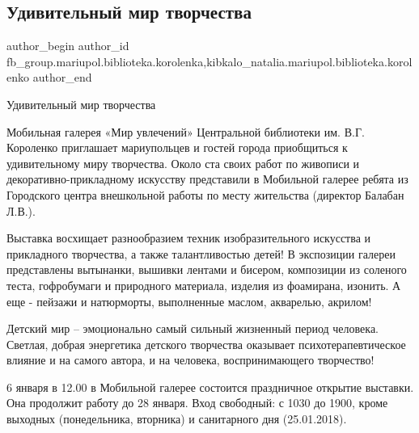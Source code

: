 
 
 
 
 

\subsection{Удивительный мир творчества}
\label{sec:04_01_2018.fb.fb_group.mariupol.biblioteka.korolenka.1.udivitelnii_mir_tvor}
 
\ifcmt
 author_begin
   author_id fb_group.mariupol.biblioteka.korolenka,kibkalo_natalia.mariupol.biblioteka.korolenko
 author_end
\fi

Удивительный мир творчества

Мобильная галерея «Мир увлечений» Центральной библиотеки им. В.Г. Короленко
приглашает мариупольцев и гостей города приобщиться к удивительному миру
творчества. Около ста своих работ по живописи и декоративно-прикладному
искусству представили в  Мобильной галерее ребята из  Городского центра
внешкольной работы по месту жительства (директор Балабан Л.В.).

Выставка восхищает разнообразием техник изобразительного искусства и
прикладного творчества, а также талантливостью детей! В экспозиции галереи
представлены вытынанки, вышивки лентами и бисером, композиции из соленого
теста, гофробумаги и природного материала, изделия из фоамирана, изонить. А еще
- пейзажи и натюрморты, выполненные маслом, акварелью, акрилом! 

Детский мир – эмоционально самый сильный жизненный период человека. Светлая,
добрая энергетика детского творчества оказывает  психотерапевтическое влияние и
на самого автора, и на человека, воспринимающего творчество!

6  января в 12.00 в Мобильной галерее состоится праздничное открытие выставки.
Она продолжит работу до 28 января. Вход свободный: с 1030 до 1900, кроме
выходных (понедельника, вторника) и санитарного дня (25.01.2018).

